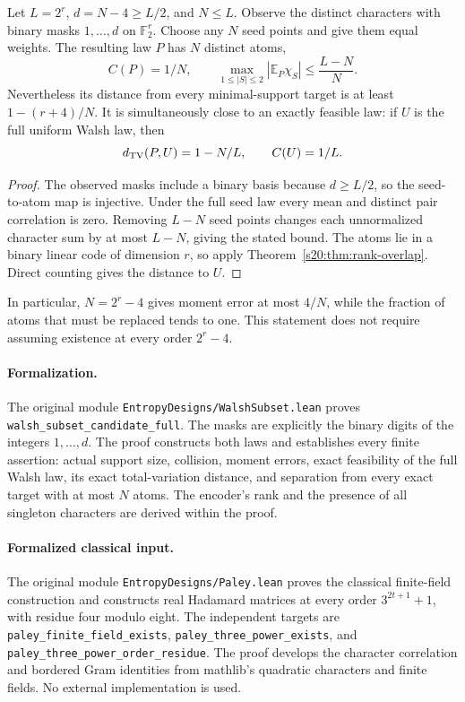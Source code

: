 \begin{proposition}
\label{s20:prop:rank-walsh-candidate}
Let $L=2^r$, $d=N-4\ge L/2$, and $N\le L$. Observe the distinct
characters with binary masks $1,\ldots,d$ on $\mathbb F_2^r$.
Choose any $N$ seed points and give them equal weights. The resulting
law $P$ has $N$ distinct atoms,
\[
 C(P)=1/N,\qquad
 \max_{1\le|S|\le2}|\mathbb E_P\chi_S|\le\frac{L-N}{N}.
\]
Nevertheless its distance from every minimal-support target is at
least $1-(r+4)/N$.
It is simultaneously close to an exactly feasible law: if $U$ is
the full uniform Walsh law, then
\[
 d_{\rm TV}(P,U)=1-N/L,\qquad C(U)=1/L.
\]
\end{proposition}
\begin{proof}
The observed masks include a binary basis because $d\ge L/2$, so
the seed-to-atom map is injective. Under the full seed law every
mean and distinct pair correlation is zero. Removing $L-N$ seed
points changes each unnormalized character sum by at most $L-N$,
giving the stated bound. The atoms lie in a binary linear code of
dimension $r$, so apply Theorem~\ref{s20:thm:rank-overlap}. Direct counting
gives the distance to $U$.
\end{proof}
In particular, $N=2^r-4$ gives moment error at most $4/N$, while the
fraction of atoms that must be replaced tends to one. This statement
does not require assuming existence at every order $2^r-4$.

\paragraph{Formalization.}
The original module \texttt{EntropyDesigns/\allowbreak WalshSubset.lean}
proves \texttt{walsh\_\allowbreak subset\_\allowbreak candidate\_\allowbreak full}.
The masks are explicitly the binary digits of the integers $1,\ldots,d$.
The proof constructs both laws and establishes every finite assertion:
actual support size, collision, moment errors, exact feasibility of the
full Walsh law, its exact total-variation distance, and separation from
every exact target with at most $N$ atoms. The encoder's rank and the
presence of all singleton characters are derived within the proof.

\paragraph{Formalized classical input.}
The original module \texttt{EntropyDesigns/\allowbreak Paley.lean}
proves the classical finite-field construction and constructs real
Hadamard matrices at every order $3^{2t+1}+1$, with residue four modulo
eight. The independent targets are
\texttt{paley\_\allowbreak finite\_\allowbreak field\_\allowbreak exists},
\texttt{paley\_\allowbreak three\_\allowbreak power\_\allowbreak exists}, and
\texttt{paley\_\allowbreak three\_\allowbreak power\_\allowbreak order\_\allowbreak residue}.
The proof develops the character correlation and bordered Gram identities
from mathlib's quadratic characters and finite fields. No external
implementation is used.

